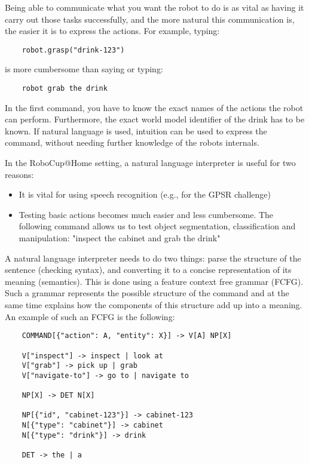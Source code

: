 Being able to communicate what you want the robot to do is as vital as having it carry out those tasks successfully, and the more natural this communication is, the easier it is to express the actions. For example, typing:

\begin{lstlisting}
    robot.grasp("drink-123")
\end{lstlisting}

is more cumbersome than saying or typing:

\begin{lstlisting}
    robot grab the drink
\end{lstlisting}

In the first command, you have to know the exact names of the actions the robot can perform. Furthermore, the exact world model identifier of the drink has to be known. If natural language is used, intuition can be used to express the command, without needing further knowledge of the robots internals.

In the RoboCup@Home setting, a natural language interpreter is useful for two reasons:

\begin{itemize}
    \item It is vital for using speech recognition (e.g., for the GPSR challenge)
    \item Testing basic actions becomes much easier and less cumbersome. The following command allows us to test object segmentation, classification and manipulation: "inspect the cabinet and grab the drink"
\end{itemize}

A natural language interpreter needs to do two things: parse the structure of the sentence (checking syntax), and converting it to a concise representation of its meaning (semantics). This is done using a feature context free grammar (FCFG). Such a grammar represents the possible structure of the command and at the same time explains how the components of this structure add up into a meaning. An example of such an FCFG is the following:

\begin{lstlisting}
    COMMAND[{"action": A, "entity": X}] -> V[A] NP[X]

    V["inspect"] -> inspect | look at
    V["grab"] -> pick up | grab       
    V["navigate-to"] -> go to | navigate to

    NP[X] -> DET N[X]

    NP[{"id", "cabinet-123"}] -> cabinet-123
    N[{"type": "cabinet"}] -> cabinet
    N[{"type": "drink"}] -> drink

    DET -> the | a
\end{lstlisting}

